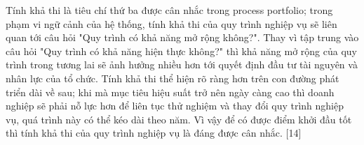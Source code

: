 Tính khả thi là tiêu chí thứ ba được cân nhắc trong process portfolio; trong phạm vi ngữ cảnh của hệ thống, tính khả thi của quy trình nghiệp vụ sẽ liên quan tới câu hỏi "Quy trình có khả năng mở rộng không?". Thay vì tập trung vào câu hỏi "Quy trình có khả năng hiện thực không?" thì khả năng mở rộng của quy trình trong tương lai sẽ ảnh hưởng nhiều hơn tới quyết định đầu tư tài nguyên và nhân lực của tổ chức. Tính khả thi thể hiện rõ ràng hơn trên con đường phát triển dài về sau; khi mà mục tiêu hiệu suất trở nên ngày càng cao thì doanh nghiệp sẽ phải nỗ lực hơn để liên tục thử nghiệm và thay đổi quy trình nghiệp vụ, quá trình này có thể kéo dài theo năm. Vì vậy để có được điểm khởi đầu tốt thì tính khả thi của quy trình nghiệp vụ là đáng được cân nhắc. [14]